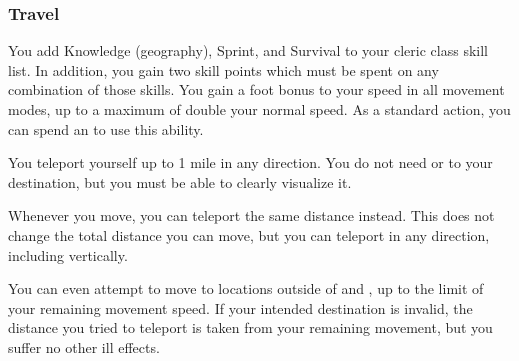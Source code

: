         \subsubsection{Travel}
             You add Knowledge (geography), Sprint, and Survival to your cleric class skill list.
            In addition, you gain two skill points which must be spent on any combination of those skills.
             You gain a  foot bonus to your speed in all movement modes, up to a maximum of double your normal speed.
             As a standard action, you can spend an  to use this ability.
            \begin{ability}
                \begin{spelleffects}
                    \spelleffect You teleport yourself up to 1 mile in any direction.
                    You do not need  or  to your destination, but you must be able to clearly visualize it.
                \end{spelleffects}
            \end{ability}
             Whenever you move, you can teleport the same distance instead.
            This does not change the total distance you can move, but you can teleport in any direction, including vertically.

            You can even attempt to move to locations outside of  and , up to the limit of your remaining movement speed.
            If your intended destination is invalid, the distance you tried to teleport is taken from your remaining movement, but you suffer no other ill effects.

